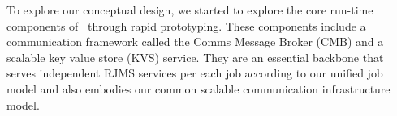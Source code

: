 To explore our conceptual design, we started to 
explore the core run-time components of \flux\
through rapid prototyping.
%
These components include a communication framework 
called the Comms Message Broker (CMB) 
and a scalable key value store (KVS) service.
They are an essential backbone that serves 
independent RJMS services per each job according to our
unified job model and also embodies our
common scalable communication infrastructure model.


